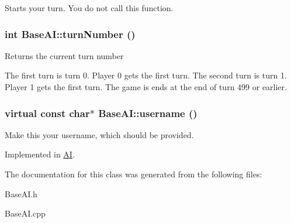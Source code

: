 Starts your turn. You do not call this function. \hypertarget{classBaseAI_19ade7391bfe101884a35f48fb840199}{
\subsubsection[{turnNumber}]{\setlength{\rightskip}{0pt plus 5cm}int BaseAI::turnNumber ()}}
\label{classBaseAI_19ade7391bfe101884a35f48fb840199}


Returns the current turn number

The first turn is turn 0. Player 0 gets the first turn. The second turn is turn 1. Player 1 gets the first turn. The game is ends at the end of turn 499 or earlier. \hypertarget{classBaseAI_ef082fbf306fec04515ed5ed3b1ba582}{
\subsubsection[{username}]{\setlength{\rightskip}{0pt plus 5cm}virtual const char$\ast$ BaseAI::username ()}}
\label{classBaseAI_ef082fbf306fec04515ed5ed3b1ba582}


Make this your username, which should be provided. 

Implemented in \hyperlink{classAI_529ac74a6f88a82abb1edd87847203e1}{AI}.

The documentation for this class was generated from the following files:\begin{CompactItemize}
\item 
BaseAI.h\item 
BaseAI.cpp\end{CompactItemize}

